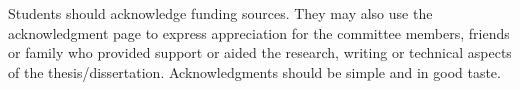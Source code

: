 \begin{acknowledgments}
	Students should acknowledge funding sources. They may also use the acknowledgment page to express appreciation for the committee members, friends or family who provided support or aided the research, writing or technical aspects of the thesis/dissertation. Acknowledgments should be simple and in good taste.
	{\color{mediumgray} \blindtext}
\end{acknowledgments}
